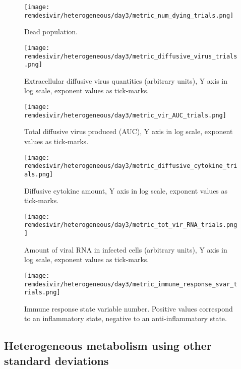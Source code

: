 \begin{figure}[H]
\texttt{[image: remdesivir/heterogeneous/day3/metric\_num\_dying\_trials.png]}
\caption{Dead population.\label{fig:app:hetero_regular:day3:dead}}
\end{figure}

\begin{figure}[H]
\texttt{[image: remdesivir/heterogeneous/day3/metric\_diffusive\_virus\_trials.png]}
\caption{Extracellular diffusive virus quantities (arbitrary units), Y axis in log scale, exponent values as tick-marks.\label{fig:app:hetero_regular:day3:diff_vir}}
\end{figure}

\begin{figure}[H]
\texttt{[image: remdesivir/heterogeneous/day3/metric\_vir\_AUC\_trials.png]}
\caption{Total diffusive virus produced (AUC), Y axis in log scale, exponent values as tick-marks.\label{fig:app:hetero_regular:day3:auc_vir}}
\end{figure}

\begin{figure}[H]
\texttt{[image: remdesivir/heterogeneous/day3/metric\_diffusive\_cytokine\_trials.png]}
\caption{Diffusive cytokine amount, Y axis in log scale, exponent values as tick-marks.\label{fig:app:hetero_regular:day3:diff_cyto}}
\end{figure}

\begin{figure}[H]
\texttt{[image: remdesivir/heterogeneous/day3/metric\_tot\_vir\_RNA\_trials.png]}
\caption{Amount of viral RNA in infected cells (arbitrary units), Y axis in log scale, exponent values as tick-marks.\label{fig:app:hetero_regular:day3:vir_RNA}}
\end{figure}

\begin{figure}[H]
\texttt{[image: remdesivir/heterogeneous/day3/metric\_immune\_response\_svar\_trials.png]}
\caption{Immune response state variable number. Positive values correspond to an inflammatory state, negative to an anti-inflammatory state.\label{fig:app:hetero_regular:day3:immune_var}}
\end{figure}
\clearpage
\subsection{Heterogeneous metabolism using other standard deviations}\label{sup:sec:extra_figures:hetero_other_sd}

